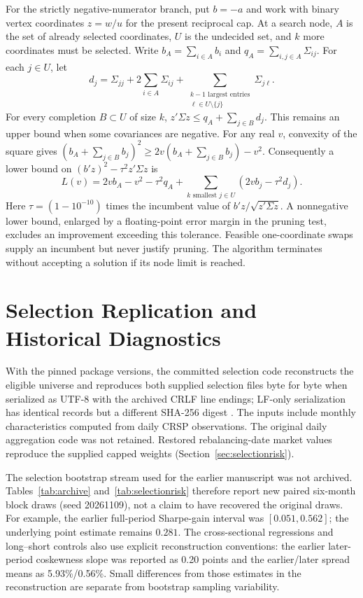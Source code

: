 \documentclass[letterpaper,journal]{IEEEtran}
\begin{document}
For the strictly negative-numerator branch, put $b=-a$ and work with binary vertex coordinates $z=w/u$ for the present reciprocal cap. At a search node, $A$ is the set of already selected coordinates, $U$ is the undecided set, and $k$ more coordinates must be selected. Write $b_A=\sum_{i\in A}b_i$ and $q_A=\sum_{i,j\in A}\Sigma_{ij}$. For each $j\in U$, let
\begin{equation}
 d_j=\Sigma_{jj}+2\sum_{i\in A}\Sigma_{ij}
 +\sum_{\substack{k-1\text{ largest entries}\\\ell\in U\setminus\{j\}}}\Sigma_{j\ell}.
\end{equation}
For every completion $B\subset U$ of size $k$, $z'\Sigma z\leq q_A+\sum_{j\in B}d_j$. This remains an upper bound when some covariances are negative. For any real $v$, convexity of the square gives $(b_A+\sum_{j\in B}b_j)^2\geq2v(b_A+\sum_{j\in B}b_j)-v^2$. Consequently a lower bound on $(b'z)^2-\tau^2z'\Sigma z$ is
\begin{equation}
 L(v)=2vb_A-v^2-\tau^2q_A+
 \sum_{k\text{ smallest }j\in U}(2vb_j-\tau^2d_j).
\end{equation}
Here $\tau=(1-10^{-10})$ times the incumbent value of $b'z/\sqrt{z'\Sigma z}$. A nonnegative lower bound, enlarged by a floating-point error margin in the pruning test, excludes an improvement exceeding this tolerance. Feasible one-coordinate swaps supply an incumbent but never justify pruning. The algorithm terminates without accepting a solution if its node limit is reached.

\section{Selection Replication and Historical Diagnostics}\label{app:selectionrep}
With the pinned package versions, the committed selection code reconstructs the eligible universe and reproduces both supplied selection files byte for byte when serialized as UTF-8 with the archived CRLF line endings; LF-only serialization has identical records but a different SHA-256 digest \cite{selectioncode}. The inputs include monthly characteristics computed from daily CRSP observations. The original daily aggregation code was not retained. Restored rebalancing-date market values reproduce the supplied capped weights (Section~\ref{sec:selectionrisk}).

The selection bootstrap stream used for the earlier manuscript was not archived. Tables~\ref{tab:archive} and~\ref{tab:selectionrisk} therefore report new paired six-month block draws (seed 20261109), not a claim to have recovered the original draws. For example, the earlier full-period Sharpe-gain interval was $[0.051,0.562]$; the underlying point estimate remains $0.281$. The cross-sectional regressions and long--short controls also use explicit reconstruction conventions: the earlier later-period coskewness slope was reported as 0.20 points and the earlier/later spread means as 5.93\%/0.56\%. Small differences from those estimates in the reconstruction are separate from bootstrap sampling variability.
\end{document}
